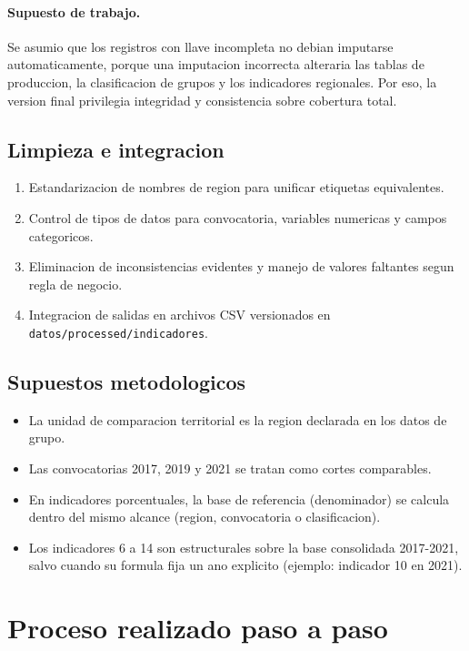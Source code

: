 \documentclass[12pt,letterpaper]{article}
\begin{document}
\paragraph{Supuesto de trabajo.}
Se asumio que los registros con llave incompleta no debian imputarse automaticamente, porque una imputacion incorrecta alteraria las tablas de produccion, la clasificacion de grupos y los indicadores regionales. Por eso, la version final privilegia integridad y consistencia sobre cobertura total.


\subsection{Limpieza e integracion}

\begin{enumerate}[label=\arabic*.]
  \item Estandarizacion de nombres de region para unificar etiquetas equivalentes.
  \item Control de tipos de datos para convocatoria, variables numericas y campos categoricos.
  \item Eliminacion de inconsistencias evidentes y manejo de valores faltantes segun regla de negocio.
  \item Integracion de salidas en archivos CSV versionados en \texttt{datos/processed/indicadores}.
\end{enumerate}

\subsection{Supuestos metodologicos}

\begin{itemize}
  \item La unidad de comparacion territorial es la region declarada en los datos de grupo.
  \item Las convocatorias 2017, 2019 y 2021 se tratan como cortes comparables.
  \item En indicadores porcentuales, la base de referencia (denominador) se calcula dentro del mismo alcance (region, convocatoria o clasificacion).
  \item Los indicadores 6 a 14 son estructurales sobre la base consolidada 2017-2021, salvo cuando su formula fija un ano explicito (ejemplo: indicador 10 en 2021).
\end{itemize}

\section{Proceso realizado paso a paso}
\end{document}
